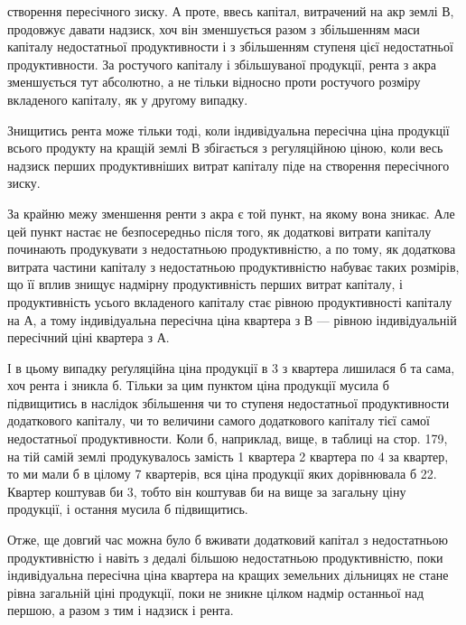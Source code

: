 \parcont{}  %
створення пересічного зиску. А проте, ввесь капітал, витрачений на акр землі $В$,
продовжує давати надзиск, хоч він зменшується разом з збільшенням маси капіталу
недостатньої продуктивности і з збільшенням ступеня цієї недостатньої
продуктивности. За ростучого капіталу і збільшуваної продукції, рента з акра
зменшується тут абсолютно, а не тільки відносно проти ростучого розміру вкладеного
капіталу, як у другому випадку.

Знищитись рента може тільки тоді, коли індивідуальна пересічна ціна
продукції всього продукту на кращій землі $В$ збігається з регуляційною ціною,
коли весь надзиск перших продуктивніших витрат капіталу піде на створення
пересічного зиску.

За крайню межу зменшення ренти з акра є той пункт, на якому вона
зникає. Але цей пункт настає не безпосередньо після того, як додаткові витрати
капіталу починають продукувати з недостатньою продуктивністю, а по тому, як
додаткова витрата частини капіталу з недостатньою продуктивністю набуває таких
розмірів, що її вплив знищує надмірну продуктивність перших витрат капіталу,
і продуктивність усього вкладеного капіталу стає рівною продуктивності капіталу
на $А$, а тому індивідуальна пересічна ціна квартера з $В$ — рівною індивідуальній
пересічний ціні квартера з $А$.

І в цьому випадку реґуляційна ціна продукції в 3 з квартера
лишилася б та сама, хоч рента і зникла б. Тільки за цим пунктом ціна продукції
мусила б підвищитись в наслідок збільшення чи то ступеня недостатньої
продуктивности додаткового капіталу, чи то величини самого додаткового
капіталу тієї самої недостатньої продуктивности. Коли б, наприклад, вище, в таблиці
на стор. 179, на тій самій землі продукувалось замість 1 квартера 2 квартера
по 4 за квартер, то ми мали б в цілому 7 квартерів, вся ціна
продукції яких дорівнювала б 22. Квартер коштував би 3,
тобто він коштував би на  вище за загальну ціну продукції, і остання
мусила б підвищитись.

Отже, ще довгий час можна було б вживати додатковий капітал з недостатньою
продуктивністю і навіть з дедалі більшою недостатньою продуктивністю,
поки індивідуальна пересічна ціна квартера на кращих земельних дільницях
не стане рівна загальній ціні продукції, поки не зникне цілком надмір останньої
над першою, а разом з тим і надзиск і рента.

